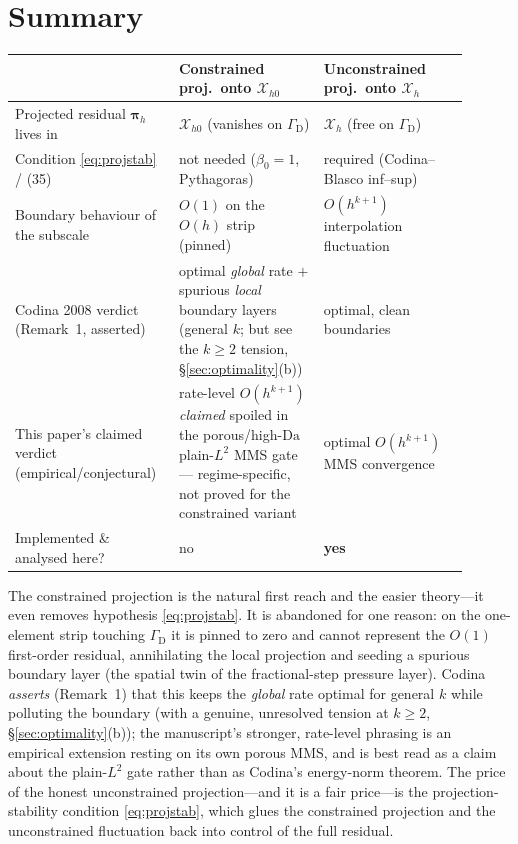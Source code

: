 \documentclass[11pt]{article}
\newcommand{\Damk}{\mathrm{Da}}
\newcommand{\bpi}{\boldsymbol{\pi}}
\newcommand{\Xh}{\mathcal{X}_{h}}
\newcommand{\Xhz}{\mathcal{X}_{h0}}
\theoremstyle{plain}
\theoremstyle{definition}
\theoremstyle{remark}
\begin{document}
\section{Summary}\label{sec:summary}

\begin{center}
\renewcommand{\arraystretch}{1.25}
\begin{tabular}{@{}p{0.30\linewidth} p{0.30\linewidth} p{0.30\linewidth}@{}}
\toprule
 & \textbf{Constrained proj.\ onto $\Xhz$} & \textbf{Unconstrained proj.\ onto $\Xh$} \\
\midrule
Projected residual $\bpi_h$ lives in
  & $\Xhz$ (vanishes on $\Gamma_{\mathrm D}$)
  & $\Xh$ (free on $\Gamma_{\mathrm D}$) \\
Condition \cref{eq:projstab} / (35)
  & not needed ($\beta_0=1$, Pythagoras)
  & required (Codina--Blasco inf--sup) \\
Boundary behaviour of the subscale
  & $O(1)$ on the $O(h)$ strip (pinned)
  & $O(h^{k+1})$ interpolation fluctuation \\
Codina 2008 verdict (Remark~1, asserted)
  & optimal \emph{global} rate $+$ spurious \emph{local} boundary layers (general $k$; but see the $k\ge2$ tension, \S\ref{sec:optimality}(b))
  & optimal, clean boundaries \\
This paper's claimed verdict (empirical/conjectural)
  & rate-level $O(h^{k+1})$ \emph{claimed} spoiled in the porous/high-$\Damk$ plain-$L^2$ MMS gate --- regime-specific, not proved for the constrained variant
  & optimal $O(h^{k+1})$ MMS convergence \\
Implemented \& analysed here?
  & no
  & \textbf{yes} \\
\bottomrule
\end{tabular}
\end{center}

\medskip

\noindent The constrained projection is the natural first reach and the
easier theory---it even removes hypothesis \cref{eq:projstab}. It is
abandoned for one reason: on the one-element strip touching
$\Gamma_{\mathrm D}$ it is pinned to zero and cannot represent the $O(1)$
first-order residual, annihilating the local projection and seeding a
spurious boundary layer (the spatial twin of the fractional-step
pressure layer). Codina \emph{asserts} (Remark~1) that this keeps the
\emph{global} rate optimal for general $k$ while polluting the boundary
(with a genuine, unresolved tension at $k\ge2$, \S\ref{sec:optimality}(b));
the manuscript's stronger, rate-level
phrasing is an empirical extension resting on its own porous MMS, and is
best read as a claim about the plain-$L^2$ gate rather than as Codina's
energy-norm theorem. The price of the honest unconstrained
projection---and it is a fair price---is the projection-stability
condition \cref{eq:projstab}, which glues the constrained projection and
the unconstrained fluctuation back into control of the full residual.
\end{document}
